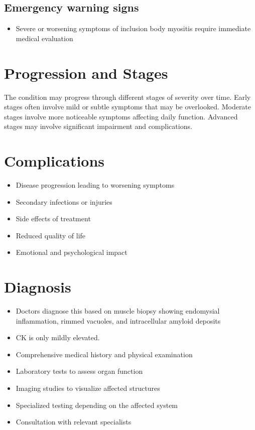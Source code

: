 \subsection{Emergency warning signs}
\begin{itemize}[noitemsep]
  \item Severe or worsening symptoms of inclusion body myositis require immediate medical evaluation
\end{itemize}
\section{Progression and Stages}
The condition may progress through different stages of severity over time. Early stages often involve mild or subtle symptoms that may be overlooked. Moderate stages involve more noticeable symptoms affecting daily function. Advanced stages may involve significant impairment and complications.
\section{Complications}
\begin{itemize}[noitemsep]
  \item Disease progression leading to worsening symptoms
  \item Secondary infections or injuries
  \item Side effects of treatment
  \item Reduced quality of life
  \item Emotional and psychological impact
\end{itemize}
\section{Diagnosis}
\begin{itemize}[noitemsep]
  \item Doctors diagnose this based on muscle biopsy showing endomysial inflammation, rimmed vacuoles, and intracellular amyloid deposits
  \item CK is only mildly elevated.
  \item Comprehensive medical history and physical examination
  \item Laboratory tests to assess organ function
  \item Imaging studies to visualize affected structures
  \item Specialized testing depending on the affected system
  \item Consultation with relevant specialists
\end{itemize}

